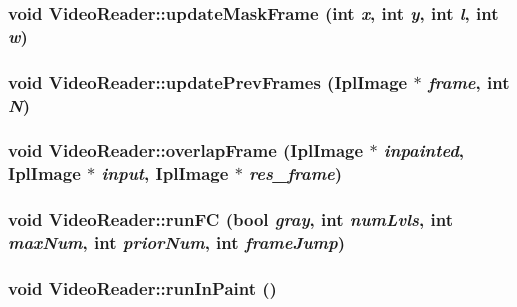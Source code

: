 \subsubsection{\setlength{\rightskip}{0pt plus 5cm}void VideoReader::updateMaskFrame (int {\em x}, int {\em y}, int {\em l}, int {\em w})}\label{classVideoReader_d134c1d615262e4e2c14af19151969e4}


\subsubsection{\setlength{\rightskip}{0pt plus 5cm}void VideoReader::updatePrevFrames (IplImage $\ast$ {\em frame}, int {\em N})\hspace{0.3cm}{\tt  [inline]}}\label{classVideoReader_b9828f954dbbbe5d7ff5dfba64dfc3b2}


\subsubsection{\setlength{\rightskip}{0pt plus 5cm}void VideoReader::overlapFrame (IplImage $\ast$ {\em inpainted}, IplImage $\ast$ {\em input}, IplImage $\ast$ {\em res\_\-frame})}\label{classVideoReader_f3d0da2e6684bc12baba5adb44e6f0c6}


\subsubsection{\setlength{\rightskip}{0pt plus 5cm}void VideoReader::runFC (bool {\em gray}, int {\em numLvls}, int {\em maxNum}, int {\em priorNum}, int {\em frameJump})}\label{classVideoReader_db9dca85fe941233dd19136090b95b78}


\subsubsection{\setlength{\rightskip}{0pt plus 5cm}void VideoReader::runInPaint ()}\label{classVideoReader_29eefb68374172ac39e6f399318cb711}


